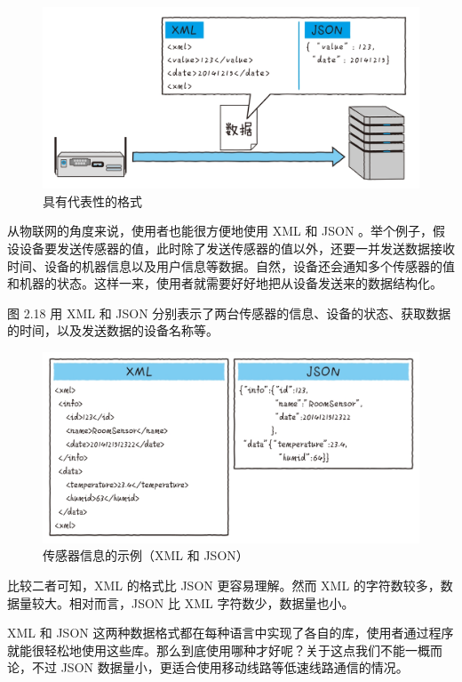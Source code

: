 \documentclass[12pt,UTF8]{ctexbook}
\begin{document}
\begin{figure}[htbp]
	\centering
	\includegraphics[width=1\linewidth]{36}
	\caption{具有代表性的格式}
	\label{fig:1}
\end{figure}

从物联网的角度来说，使用者也能很方便地使用 XML 和 JSON 。举个例子，假设设备要发送传感器的值，此时除了发送传感器的值以外，还要一并发送数据接收时间、设备的机器信息以及用户信息等数据。自然，设备还会通知多个传感器的值和机器的状态。这样一来，使用者就需要好好地把从设备发送来的数据结构化。

图 2.18 用 XML 和 JSON 分别表示了两台传感器的信息、设备的状态、获取数据的时间，以及发送数据的设备名称等。

\begin{figure}[htbp]
	\centering
	\includegraphics[width=1\linewidth]{37}
	\caption{传感器信息的示例（XML 和 JSON）}
	\label{fig:1}
\end{figure}

比较二者可知，XML 的格式比 JSON 更容易理解。然而 XML 的字符数较多，数据量较大。相对而言，JSON 比 XML 字符数少，数据量也小。

XML 和 JSON 这两种数据格式都在每种语言中实现了各自的库，使用者通过程序就能很轻松地使用这些库。那么到底使用哪种才好呢？关于这点我们不能一概而论，不过 JSON 数据量小，更适合使用移动线路等低速线路通信的情况。
\end{document}

